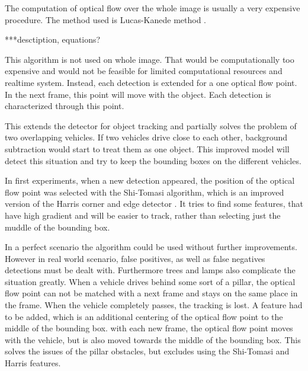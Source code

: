 \documentclass[a4paper,12pt,titlepage, twoside]{article}
\numberwithin{figure}{section}
\begin{document}
The computation of optical flow over the whole image is usually a very expensive procedure. The method used is Lucas-Kanede method \cite{lucas-kanede}. 

***desctiption, equations?


This algorithm is not used on whole image. That would be computationally too expensive and would not be feasible for limited computational resources and realtime system. Instead, each detection is extended for a one optical flow point. In the next frame, this point will move with the object. Each detection is characterized through this point. 

This extends the detector for object tracking and partially solves the problem of two overlapping vehicles. If two vehicles drive close to each other, background subtraction would start to treat them as one object. This improved model will detect this situation and try to keep the bounding boxes on the different vehicles. 

In first experiments, when a new detection appeared, the position of the optical flow point was selected with the Shi-Tomasi \cite{shi-tomasi} algorithm, which is an improved version of the Harris corner and edge detector \cite{harris}. It tries to find some features, that have high gradient and will be easier to track, rather than selecting just the muddle of the bounding box.



In a perfect scenario the algorithm could be used without further improvements. However in real world scenario, false positives, as well as false negatives detections must be dealt with. Furthermore trees and lamps also complicate the situation greatly. When a vehicle drives behind some sort of a pillar, the optical flow point can not be matched with a next frame and stays on the same place in the frame. When the vehicle completely passes, the tracking is lost. A feature had to be added, which is an additional centering of the optical flow point to the middle of the bounding box. with each new frame, the optical flow point moves with the vehicle, but is also moved towards the middle of the bounding box. This solves the issues of the pillar obstacles, but excludes using the Shi-Tomasi and Harris features. 
\end{document}
